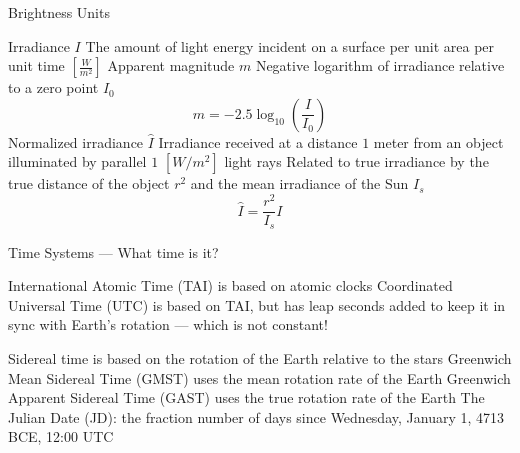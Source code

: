 \documentclass{beamer}
\begin{document}
\begin{frame}{Brightness Units}
    \begin{outline}
        \1 Irradiance $I$
        \2 The amount of light energy incident on a surface per unit area per unit time $\left[ \frac{W}{m^2} \right]$
        \1 Apparent magnitude $m$
        \2 Negative logarithm of irradiance relative to a zero point $I_0$
        \begin{equation*}
            m = -2.5 \log_{10}\left( \frac{I}{I_0} \right)
        \end{equation*}
        \1 Normalized irradiance $\hat{I}$
        \2 Irradiance received at a distance $1$ meter from an object illuminated by parallel $1$ $\left[W/m^2\right]$ light rays
        \2 Related to true irradiance by the true distance of the object $r^2$ and the mean irradiance of the Sun $I_s$
        \begin{equation*}
        \hat{I} = \frac{r^2}{I_s} I
        \end{equation*}
    \end{outline}
\end{frame}

\begin{frame}{Time Systems --- What time is it?}
    \begin{outline}
        \1 International Atomic Time (TAI) is based on atomic clocks
        \1 Coordinated Universal Time (UTC) is based on TAI, but has leap seconds added to keep it in sync with Earth's rotation --- which is not constant!
    \end{outline}

    \begin{outline}
        \1 Sidereal time is based on the rotation of the Earth relative to the stars
        \2 Greenwich Mean Sidereal Time (GMST) uses the mean rotation rate of the Earth
        \2 Greenwich Apparent Sidereal Time (GAST) uses the true rotation rate of the Earth
        \1 The Julian Date (JD): the fraction number of days since Wednesday, January 1, 4713 BCE, 12:00 UTC
    \end{outline}
\end{frame}
\end{document}
